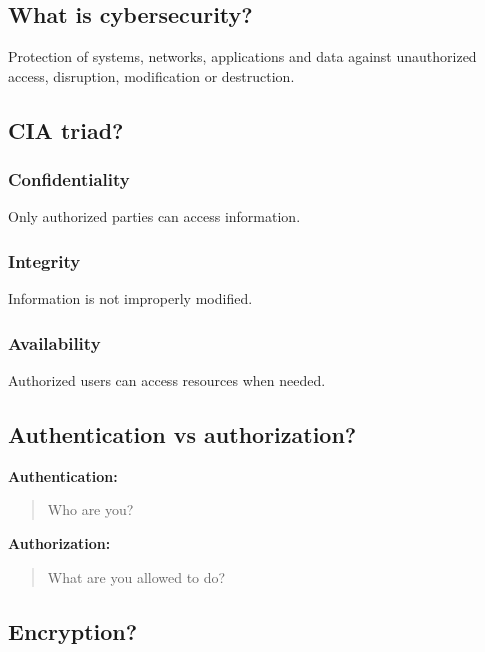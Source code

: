 \subsection{What is cybersecurity?}

Protection of systems, networks, applications and data against unauthorized access, disruption, modification or destruction.

\medskip

\subsection{CIA triad?}

\subsubsection{Confidentiality}

Only authorized parties can access information.

\subsubsection{Integrity}

Information is not improperly modified.

\subsubsection{Availability}

Authorized users can access resources when needed.

\medskip

\subsection{Authentication vs authorization?}

\textbf{Authentication:}

\begin{quote}
Who are you?\\
\end{quote}

\textbf{Authorization:}

\begin{quote}
What are you allowed to do?\\
\end{quote}

\medskip

\subsection{Encryption?}

